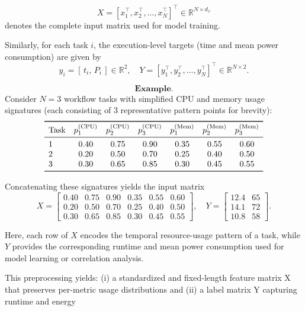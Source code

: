 \[
    X =
    [x_1^\top, x_2^\top, \dots, x_N^\top]^\top
    \in \mathbb{R}^{N \times d_x}
\]
denotes the complete input matrix used for model training.

Similarly, for each task \( i \), the execution-level targets
(time and mean power consumption) are given by
\[
    y_i = [\,t_i,\, P_i\,] \in \mathbb{R}^2,
    \quad
    Y = [y_1^\top, y_2^\top, \dots, y_N^\top]^\top
    \in \mathbb{R}^{N \times 2}.
\]

\[
    \textbf{Example.}
\]
Consider \( N = 3 \) workflow tasks with simplified
CPU and memory usage signatures
(each consisting of 3 representative pattern points for brevity):
\[
    \begin{array}{lcccccc}
        \toprule
        \text{Task}        &
        p_1^{(\text{CPU})} & p_2^{(\text{CPU})} & p_3^{(\text{CPU})} &
        p_1^{(\text{Mem})} & p_2^{(\text{Mem})} & p_3^{(\text{Mem})}                             \\
        \midrule
        1                  & 0.40               & 0.75               & 0.90 & 0.35 & 0.55 & 0.60 \\
        2                  & 0.20               & 0.50               & 0.70 & 0.25 & 0.40 & 0.50 \\
        3                  & 0.30               & 0.65               & 0.85 & 0.30 & 0.45 & 0.55 \\
        \bottomrule
    \end{array}
\]

Concatenating these signatures yields the input matrix
\[
    X =
    \begin{bmatrix}
        0.40 & 0.75 & 0.90 & 0.35 & 0.55 & 0.60 \\
        0.20 & 0.50 & 0.70 & 0.25 & 0.40 & 0.50 \\
        0.30 & 0.65 & 0.85 & 0.30 & 0.45 & 0.55
    \end{bmatrix},
    \quad
    Y =
    \begin{bmatrix}
        12.4 & 65 \\
        14.1 & 72 \\
        10.8 & 58
    \end{bmatrix}.
\]

Here, each row of \( X \) encodes the temporal resource-usage pattern
of a task, while \( Y \) provides the corresponding runtime and mean
power consumption used for model learning or correlation analysis.

This preprocessing yields: (i) a standardized and fixed-length feature matrix X that preserves per-metric usage distributions and (ii) a label matrix Y capturing runtime and energy


